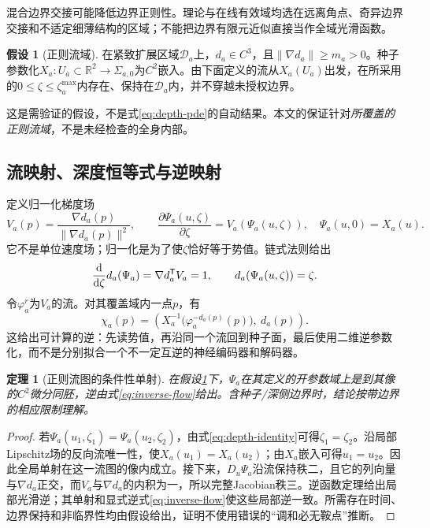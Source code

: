 \documentclass[UTF8,11pt,a4paper,fontset=fandol]{ctexart}
\numberwithin{equation}{section}
\theoremstyle{plain}
\newtheorem{theorem}[proposition]{定理}
\theoremstyle{definition}
\newtheorem{assumption}[proposition]{假设}
\theoremstyle{remark}
\newcommand{\R}{\mathbb R}\newcommand{\E}{\mathbb E}
\begin{document}
混合边界交接可能降低边界正则性。理论与在线有效域均选在远离角点、奇异边界交接和不适定细薄结构的区域；不能把边界有限元近似直接当作全域光滑函数。

\begin{assumption}[正则流域]\label{ass:regular}
在紧致扩展区域$\mathcal D_a$上，$d_a\in C^3$，且$\|\nabla d_a\|\geq m_a>0$。种子参数化$X_a:U_a\subset\R^2\to\Sigma_{a,0}$为$C^2$嵌入。由下面定义的流从$X_a(U_a)$出发，在所采用的$0\leq\zeta\leq\zeta_a^{\max}$内存在、保持在$\mathcal D_a$内，并不穿越未授权边界。
\end{assumption}

这是需验证的假设，不是式\eqref{eq:depth-pde}的自动结果。本文的保证针对\emph{所覆盖的正则流域}，不是未经检查的全身内部。

\subsection{流映射、深度恒等式与逆映射}
定义归一化梯度场
\begin{equation}
 V_a(p)=\frac{\nabla d_a(p)}{\|\nabla d_a(p)\|^2},
 \qquad \frac{\partial\Psi_a(u,\zeta)}{\partial\zeta}
 =V_a(\Psi_a(u,\zeta)),\quad \Psi_a(u,0)=X_a(u).
 \label{eq:flow-definition}
\end{equation}
它不是单位速度场；归一化是为了使$\zeta$恰好等于势值。链式法则给出
\begin{equation}
 \frac{\mathrm d}{\mathrm d\zeta}d_a(\Psi_a)
 =\nabla d_a^{\mathsf T} V_a=1,
 \qquad d_a(\Psi_a(u,\zeta))=\zeta.
 \label{eq:depth-identity}
\end{equation}
令$\varphi_a^r$为$V_a$的流。对其覆盖域内一点$p$，有
\begin{equation}
 \boxed{
 \chi_a(p)=
 \left(X_a^{-1}\bigl(\varphi_a^{-d_a(p)}(p)\bigr),\ d_a(p)\right).
 }
 \label{eq:inverse-flow}
\end{equation}
这给出可计算的逆：先读势值，再沿同一个流回到种子面，最后使用二维逆参数化，而不是分别拟合一个不一定互逆的神经编码器和解码器。

\begin{theorem}[正则流图的条件性单射]\label{thm:flow-diffeo}
在假设\ref{ass:regular}下，$\Psi_a$在其定义的开参数域上是到其像的$C^2$微分同胚，逆由式\eqref{eq:inverse-flow}给出。含种子/深侧边界时，结论按带边界的相应限制理解。
\end{theorem}
\begin{proof}
若$\Psi_a(u_1,\zeta_1)=\Psi_a(u_2,\zeta_2)$，由式\eqref{eq:depth-identity}可得$\zeta_1=\zeta_2$。沿局部Lipschitz场的反向流唯一性，使$X_a(u_1)=X_a(u_2)$；由$X_a$嵌入可得$u_1=u_2$。因此全局单射在这一流图的像内成立。接下来，$D_u\Psi_a$沿流保持秩二，且它的列向量与$\nabla d_a$正交，而$V_a$与$\nabla d_a$的内积为一，所以完整Jacobian秩三。逆函数定理给出局部光滑逆；其单射和显式逆式\eqref{eq:inverse-flow}使这些局部逆一致。所需存在时间、边界保持和非临界性均由假设给出，证明不使用错误的“调和必无鞍点”推断。
\end{proof}
\end{document}
